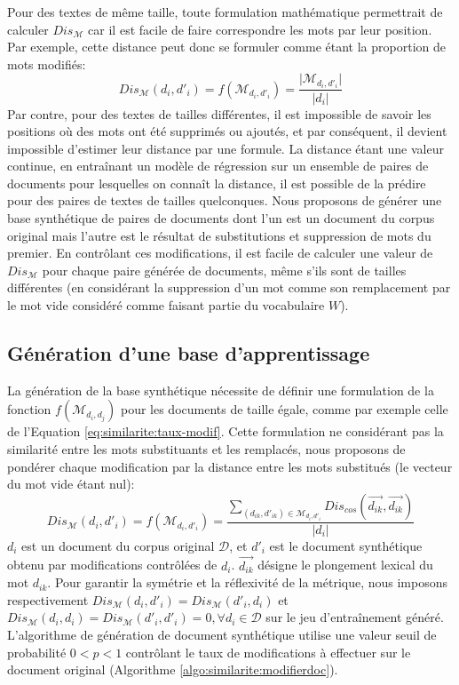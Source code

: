 Pour des textes de même taille, toute formulation mathématique permettrait de calculer $Dis_\mathcal{M}$ car il est facile de faire correspondre les mots par leur position. Par exemple, cette distance peut donc se formuler comme étant la proportion de mots modifiés:
\begin{equation}
{Dis_\mathcal{M}}(d_i, d'_i) = {f}(\mathcal{M}_{d_i, d'_i}) = \frac{\vert \mathcal{M}_{d_i, d'_i} \vert}{\vert d_i \vert } \label{eq:similarite:taux-modif}
\end{equation}
 Par contre, pour des textes de tailles différentes, il est impossible de savoir les positions où des mots ont été supprimés ou ajoutés, et par conséquent, il devient impossible d'estimer leur distance par une formule. La distance étant une valeur continue, en entraînant un modèle de régression sur un ensemble de paires de documents pour lesquelles on connaît la distance, il est possible de la prédire pour des paires de textes de tailles quelconques. Nous proposons de générer une base synthétique de paires de documents dont l'un est un document du corpus original mais l'autre est le résultat de substitutions et suppression de mots du premier. En contrôlant ces modifications, il est facile de calculer une valeur de $Dis_\mathcal{M}$ pour chaque paire générée de documents, même s'ils sont de tailles différentes (en considérant la suppression d'un mot comme son remplacement par le \og mot vide \fg{} considéré comme faisant partie du vocabulaire $W$).

\subsection{Génération d'une base d'apprentissage}
La génération de la base synthétique nécessite de définir une formulation de la fonction $f(\mathcal{M}_{d_i, d_j})$ pour les documents de taille égale, comme par exemple celle de l'Equation \ref{eq:similarite:taux-modif}. Cette formulation ne considérant pas la similarité entre les mots substituants et les remplacés, nous proposons de pondérer chaque modification par la distance entre les mots substitués (le vecteur du  \og mot vide \fg{} étant nul):
\begin{equation}
{Dis_\mathcal{M}}(d_i, d'_i) = {f}(\mathcal{M}_{d_i, d'_i}) = \frac{\sum\limits_{(d_{ik}, d'_{ik}) \in \mathcal{M}_{d_i, d'_i}} Dis_{cos}(\vec{d_{ik}}, \vec{d_{ik}})}{\vert d_i \vert} \label{eq:similarite:somme-dist-mots}
\end{equation}
$d_i$ est un document du corpus original $\mathcal{D}$, et $d'_i$ est le document synthétique obtenu par modifications contrôlées de $d_i$. $\vec{d_{ik}}$ désigne le plongement lexical du mot $d_{ik}$. Pour garantir la symétrie et la réflexivité de la métrique, nous imposons respectivement ${Dis_\mathcal{M}}(d_i, d'_i) = {Dis_\mathcal{M}}(d'_i, d_i)$ et ${Dis_\mathcal{M}}(d_i, d_i) = {Dis_\mathcal{M}}(d'_i, d'_i) = 0, \forall d_i \in \mathcal{D}$ sur le jeu d'entraînement généré. L'algorithme de génération de document synthétique utilise une valeur seuil de probabilité $0<p<1$ contrôlant le taux de modifications à effectuer sur le document original (Algorithme \ref{algo:similarite:modifierdoc}). 

